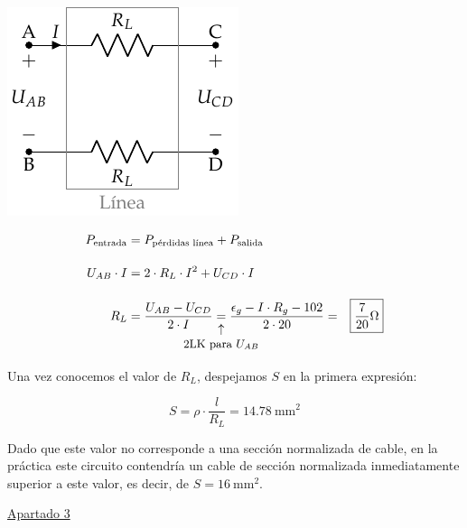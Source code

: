 \begin{example}
\begin{itemize}
    \vspace{2mm}
    \begin{minipage}{0.4\linewidth}
      \begin{center}
        \includegraphics[scale=1.2]{../figs/linea_lkv.pdf}
      \end{center}
    \end{minipage}
    \begin{minipage}{0.6\linewidth}
      \begin{align*}
        P_{\textrm{entrada}} &= P_{\textrm{pérdidas línea}} + P_{\textrm{salida}}\\[10pt]
        U_{AB} \cdot I &= 2 \cdot R_L \cdot I^2 + U_{CD} \cdot I\\[10pt] 
        R_L &= \frac{U_{AB}-U_{CD}}{2 \cdot I} \underarrow[=][\uparrow]{\small 2LK para \ensuremath{U_{AB}} } \frac{\epsilon_g - I\cdot R_g - 102}{2 \cdot 20} = \Aboxed{ {\frac{7}{20}}\si{\ohm} }
      \end{align*}
    \end{minipage}
  \end{itemize}

  Una vez conocemos el valor de $R_L$, despejamos $S$ en la primera
  expresión:

\[
  S = \rho \cdot \frac{l}{R_L} = \boxed{
    \qty{14.78}{\milli\meter\squared} }
\]

Dado que este valor no corresponde a una sección normalizada de cable,
en la práctica este circuito contendría un cable de sección
normalizada inmediatamente superior a este valor, es decir, de
$S = \qty{16}{\milli\meter\squared}$.

\vspace{6mm}

\underline{Apartado 3}


\end{example}
